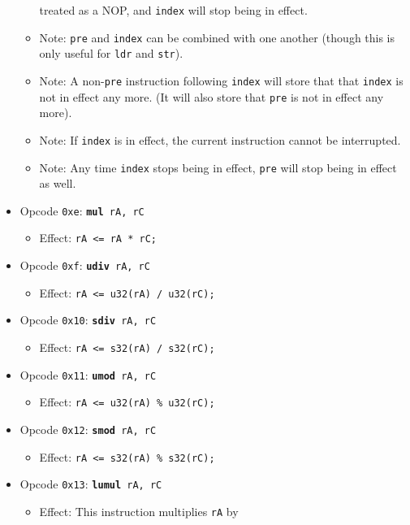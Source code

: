 \documentclass{article}
\begin{document}
\begin{itemize}
\begin{itemize}
			treated as a NOP, and \texttt{index} will stop being in effect.
			\item Note:  \texttt{pre} and \texttt{index} can be combined
			with one another (though this is only useful for \texttt{ldr}
			and \texttt{str}).
			\item Note:  A non-\texttt{pre} instruction following
			\texttt{index} will store that that \texttt{index} is not in
			effect any more.  (It will also store that \texttt{pre} is not
			in effect any more).
			\item Note:  If \texttt{index} is in effect, the current
			instruction cannot be interrupted.
			\item Note:  Any time \texttt{index} stops being in effect,
			\texttt{pre} will stop being in effect as well.
		\end{itemize}
		\item Opcode \texttt{0xe}:
			\texttt{\textbf{mul} rA, rC}
		\begin{itemize}
			\item Effect:  \texttt{rA <= rA * rC;}
		\end{itemize}
		\item Opcode \texttt{0xf}:
			\texttt{\textbf{udiv} rA, rC}
		\begin{itemize}
			\item Effect:  \texttt{rA <= u32(rA) / u32(rC);}
		\end{itemize}
		\item Opcode \texttt{0x10}:
			\texttt{\textbf{sdiv} rA, rC}
		\begin{itemize}
			\item Effect:  \texttt{rA <= s32(rA) / s32(rC);}
		\end{itemize}
		\item Opcode \texttt{0x11}:
			\texttt{\textbf{umod} rA, rC}
		\begin{itemize}
			\item Effect:  \texttt{rA <= u32(rA) \% u32(rC);}
		\end{itemize}
		\item Opcode \texttt{0x12}:
			\texttt{\textbf{smod} rA, rC}
		\begin{itemize}
			\item Effect:  \texttt{rA <= s32(rA) \% s32(rC);}
		\end{itemize}
		\item Opcode \texttt{0x13}:
			\texttt{\textbf{lumul} rA, rC}
		\begin{itemize}
			\item Effect:  This instruction multiplies \texttt{rA} by

\end{itemize}
\end{itemize}
\end{document}
